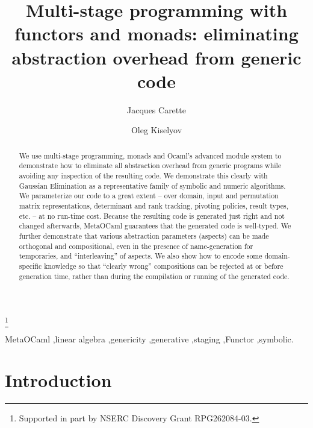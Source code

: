 \documentclass{elsart}
\begin{document}
\begin{frontmatter}
\title{Multi-stage programming with functors and monads:
eliminating abstraction overhead from generic code}
\author{Jacques Carette}
\address{McMaster University,
1280 Main St. West, Hamilton, Ontario Canada L8S 4K1}
\author{Oleg Kiselyov}
\address{FNMOC, Monterey, CA 93943}


\thanks[1]{Supported in part by NSERC Discovery Grant RPG262084-03.}

\begin{abstract}
We use multi-stage programming, monads and Ocaml's
advanced module system to demonstrate how to eliminate all
abstraction overhead from generic programs while avoiding any inspection of
the resulting code.  We demonstrate this clearly with Gaussian Elimination as a 
representative family of symbolic and numeric algorithms. 
We parameterize our code to a great extent --
over domain, input and permutation matrix representations, 
determinant and rank tracking, 
pivoting policies, result types, etc. -- at no run-time cost.  Because
the resulting code is generated just right and not changed afterwards,
MetaOCaml guarantees that the generated code is well-typed.
We further demonstrate that various abstraction parameters (aspects)
can be made orthogonal and compositional, even in the presence of
name-generation for temporaries, and 
``interleaving'' of aspects.  We also show how to encode some
domain-specific knowledge so that ``clearly wrong'' compositions can
be rejected at or before generation time, rather than during
the compilation or running of the generated code.
\end{abstract}

\begin{keyword}
MetaOCaml \sep linear algebra \sep genericity \sep generative \sep staging
\sep Functor \sep symbolic.
\end{keyword}
\end{frontmatter}

\section{Introduction}
\end{document}
